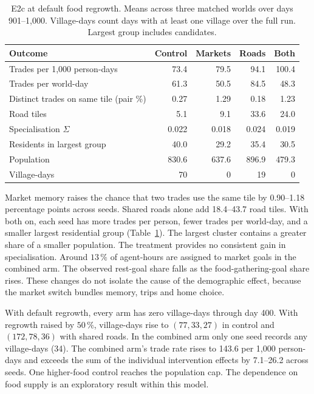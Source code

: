 \documentclass[11pt]{article}
\theoremstyle{definition}
\newcommand{\1}{\mathbf{1}}
\begin{document}
\begin{table}[ht]
\centering\small
\caption{E2c at default food regrowth. Means across three matched worlds over days 901--1,000. Village-days count days with at least one village over the full run. Largest group includes candidates.}
\label{tab:cities}
\begin{tabular}{lrrrr}
\toprule
Outcome & Control & Markets & Roads & Both \\
\midrule
Trades per 1,000 person-days & 73.4 & 79.5 & 94.1 & 100.4 \\
Trades per world-day & 61.3 & 50.5 & 84.5 & 48.3 \\
Distinct trades on same tile (pair \%) & 0.27 & 1.29 & 0.18 & 1.23 \\
Road tiles & 5.1 & 9.1 & 33.6 & 24.0 \\
Specialisation $\Sigma$ & 0.022 & 0.018 & 0.024 & 0.019 \\
Residents in largest group & 40.0 & 29.2 & 35.4 & 30.5 \\
Population & 830.6 & 637.6 & 896.9 & 479.3 \\
Village-days & 70 & 0 & 19 & 0 \\
\bottomrule
\end{tabular}
\end{table}

Market memory raises the chance that two trades use the same tile by 0.90--1.18 percentage points across seeds. Shared roads alone add 18.4--43.7 road tiles. With both on, each seed has more trades per person, fewer trades per world-day, and a smaller largest residential group (Table~\ref{tab:cities}). The largest cluster contains a greater share of a smaller population. The treatment provides no consistent gain in specialisation. Around $13\,\%$ of agent-hours are assigned to market goals in the combined arm. The observed rest-goal share falls as the food-gathering-goal share rises. These changes do not isolate the cause of the demographic effect, because the market switch bundles memory, trips and home choice.

With default regrowth, every arm has zero village-days through day 400. With regrowth raised by $50\,\%$, village-days rise to $(77,33,27)$ in control and $(172,78,36)$ with shared roads. In the combined arm only one seed records any village-days (34). The combined arm's trade rate rises to 143.6 per 1,000 person-days and exceeds the sum of the individual intervention effects by 7.1--26.2 across seeds. One higher-food control reaches the population cap. The dependence on food supply is an exploratory result within this model.
\end{document}
